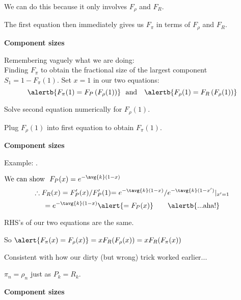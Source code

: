 \begin{frame}[label=]
\begin{frame}[label=]
\begin{frame}[label=]
\begin{frame}[label=]
\begin{frame}[label=]
\begin{frame}[label=]
\begin{frame}[label=]
\begin{frame}[label=]
\begin{frame}[label=]
\begin{frame}[label=]
\begin{frame}[label=]
\begin{frame}[label=rn-sneakyresult1]
\begin{frame}[label=]
\begin{frame}[label=]
\begin{frame}[label=rn-sneakyresult2]
\begin{frame}[label=]
\begin{frame}[label=]
\begin{frame}[label=]
\begin{frame}[label=]
\begin{frame}[label=]
    We can do this because it \alert{only involves} $F_\rho$ and $F_R$.
  
    The first equation then immediately gives us $F_\pi$ in
    terms of $F_\rho$ and $F_R$.
  


\begin{frame}[label=]
  \textbf{Component sizes}
  
  
   
    Remembering vaguely what we are doing:\\
    \medskip
    {
    Finding $F_\pi$ to obtain the \alert{fractional size of the largest component} $S_1 = 1 - F_\pi(1)$.
    }
   Set $x=1$ in our two equations:
    {
    $$
    \alertb{
      F_{\pi}(1)
      =
      F_{P}
      \left(
        F_{\rho} (1)
      \right)
    }
    \mbox{\ \  and \ \ }
    \alertb{
    F_{\rho}(1)
    =
    F_{R}
    \left(
      F_{\rho} (1)
    \right)
    }
    $$
    }
  
    Solve second equation numerically for $F_{\rho}(1)$.
  
    Plug $F_{\rho}(1)$ into first equation to
    obtain $F_{\pi}(1)$.
  


\begin{frame}[label=]
  \textbf{Component sizes}

  \alert{Example}: .
  
  
    $
    \mbox{We can show \ }
    F_P(x) = e^{-\avg{k}(1-x)}
    $
        {
    $$
    \therefore
    F_R(x) = F'_P(x)/F'_P(1) 
    {
      = e^{-\tavg{k}(1-x)}/e^{-\tavg{k}(1-x')}|_{x'=1}
    }
    $$
    }
    $$
    {
      = e^{-\tavg{k}(1-x)}
    }
    {
      \alert{= F_P(x)} \qquad \alertb{\mbox{...aha!}}
    }
    $$
    
      RHS's of our two equations are the same.
     
      So $\alert{F_\pi(x) = F_\rho(x)} = x F_R(F_\rho(x)) = x F_R(F_\pi(x))$
    
      Consistent with how our dirty (but wrong) trick worked earlier...
    
      $\pi_n = \rho_n$ just as $P_k = R_k$.
  



\begin{frame}[label=]
  \textbf{Component sizes}

  
   

\end{frame}
\end{frame}
\end{frame}
\end{frame}
\end{frame}
\end{frame}
\end{frame}
\end{frame}
\end{frame}
\end{frame}
\end{frame}
\end{frame}
\end{frame}
\end{frame}
\end{frame}
\end{frame}
\end{frame}
\end{frame}
\end{frame}
\end{frame}
\end{frame}
\end{frame}
\end{frame}
